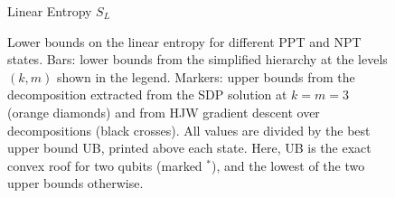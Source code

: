 %
\begin{figure}
{Linear Entropy $S_L$}
  \centering
  \caption{Lower bounds on the linear entropy for different PPT and NPT states. Bars: lower bounds from the simplified hierarchy at the levels $(k,m)$ shown in the legend. Markers: upper bounds from the decomposition extracted from the SDP solution at $k=m=3$ (orange diamonds) and from HJW gradient descent over decompositions (black crosses). All values are divided by the best upper bound UB, printed above each state. Here, UB is the exact convex roof for two qubits (marked $^*$), and the lowest of the two upper bounds otherwise.}
  \label{fig:namedLinearEntropy}
\end{figure}
